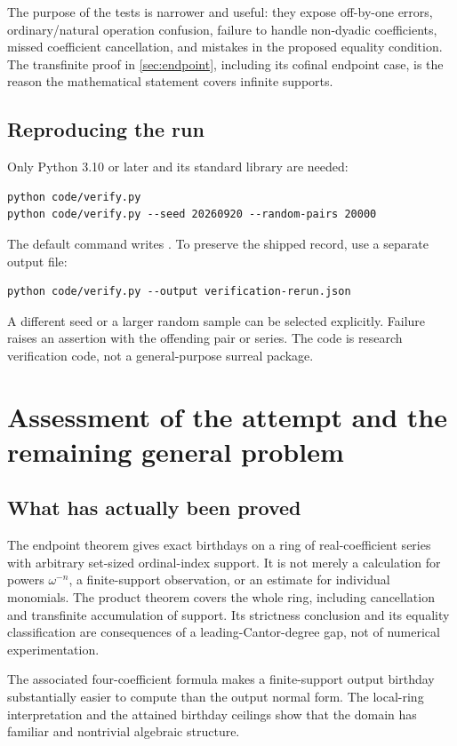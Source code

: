 \documentclass[11pt,letterpaper]{article}
\theoremstyle{definition}
\theoremstyle{remark}
\begin{document}
The purpose of the tests is narrower and useful: they expose off-by-one
errors, ordinary/natural operation confusion, failure to handle
non-dyadic coefficients, missed coefficient cancellation, and mistakes in
the proposed equality condition. The transfinite proof in
\cref{sec:endpoint}, including its cofinal endpoint case, is the reason
the mathematical statement covers infinite supports.

\subsection{Reproducing the run}
Only Python 3.10 or later and its standard library are needed:
\begin{lstlisting}
python code/verify.py
python code/verify.py --seed 20260920 --random-pairs 20000
\end{lstlisting}
The default command writes . To preserve the
shipped record, use a separate output file:
\begin{lstlisting}
python code/verify.py --output verification-rerun.json
\end{lstlisting}
A different seed or a larger random sample can be selected explicitly.
Failure raises an assertion with the offending pair or series. The code
is research verification code, not a general-purpose surreal package.

\section{Assessment of the attempt and the remaining general problem}

\subsection{What has actually been proved}
The endpoint theorem gives exact birthdays on a ring of real-coefficient
series with arbitrary set-sized ordinal-index support. It is not merely a
calculation for powers \(\omega^{-n}\), a finite-support observation, or
an estimate for individual monomials. The product theorem covers the
whole ring, including cancellation and transfinite accumulation of support.
Its strictness conclusion and its equality classification are consequences
of a leading-Cantor-degree gap, not of numerical experimentation.

The associated four-coefficient formula makes a finite-support output
birthday substantially easier to compute than the output normal form.
The local-ring interpretation and the attained birthday ceilings show
that the domain has familiar and nontrivial algebraic structure.
\end{document}
